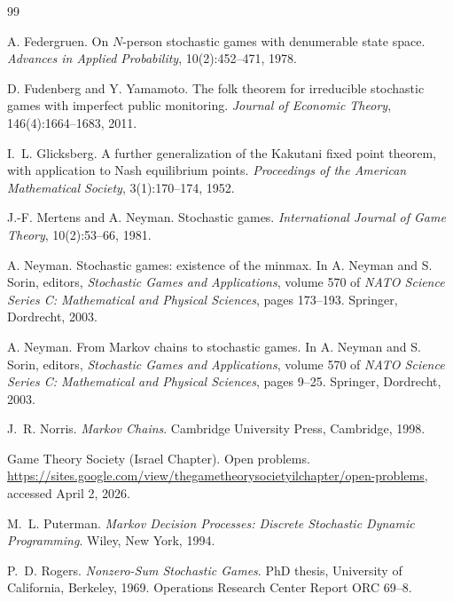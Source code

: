 \documentclass[11pt]{article}
\theoremstyle{definition}
\newcommand{\1}{\mathbf{1}}
\begin{document}
\begin{thebibliography}{99}

A. Federgruen.
\newblock On $N$-person stochastic games with denumerable state space.
\newblock \emph{Advances in Applied Probability}, 10(2):452--471, 1978.

D. Fudenberg and Y. Yamamoto.
\newblock The folk theorem for irreducible stochastic games with imperfect public monitoring.
\newblock \emph{Journal of Economic Theory}, 146(4):1664--1683, 2011.

I.~L. Glicksberg.
\newblock A further generalization of the Kakutani fixed point theorem, with application to Nash equilibrium points.
\newblock \emph{Proceedings of the American Mathematical Society}, 3(1):170--174, 1952.

J.-F. Mertens and A. Neyman.
\newblock Stochastic games.
\newblock \emph{International Journal of Game Theory}, 10(2):53--66, 1981.

A. Neyman.
\newblock Stochastic games: existence of the minmax.
\newblock In A. Neyman and S. Sorin, editors, \emph{Stochastic Games and Applications}, volume 570 of \emph{NATO Science Series C: Mathematical and Physical Sciences}, pages 173--193. Springer, Dordrecht, 2003.

A. Neyman.
\newblock From Markov chains to stochastic games.
\newblock In A. Neyman and S. Sorin, editors, \emph{Stochastic Games and Applications}, volume 570 of \emph{NATO Science Series C: Mathematical and Physical Sciences}, pages 9--25. Springer, Dordrecht, 2003.

J.~R. Norris.
\newblock \emph{Markov Chains}.
\newblock Cambridge University Press, Cambridge, 1998.

Game Theory Society (Israel Chapter).
\newblock Open problems.
\newblock \url{https://sites.google.com/view/thegametheorysocietyilchapter/open-problems}, accessed April 2, 2026.

M.~L. Puterman.
\newblock \emph{Markov Decision Processes: Discrete Stochastic Dynamic Programming}.
\newblock Wiley, New York, 1994.

P.~D. Rogers.
\newblock \emph{Nonzero-Sum Stochastic Games}.
\newblock PhD thesis, University of California, Berkeley, 1969.
\newblock Operations Research Center Report ORC 69--8.


\end{thebibliography}
\end{document}
